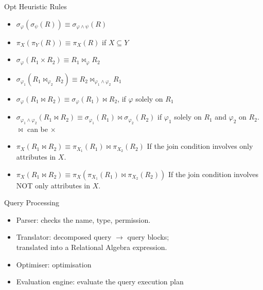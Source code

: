 \documentclass[a4paper]{article}
\begin{document}
\begin{multicols}{3}
\begin{cheatsheetblock} {Opt Heuristic Rules}
    \begin{itemize}
        \item $\sigma_{\varphi}\left(\sigma_\psi(R)\right) \equiv \sigma_{\varphi \wedge \psi}(R)$
        \item $\pi_X\left(\pi_Y(R)\right) \equiv \pi_X(R)$ if $X \subseteq Y$
        \item $\sigma_{\varphi}\left(R_1 \times R_2\right) \equiv R_1 \bowtie_{\varphi} R_2$
        \item $\sigma_{\varphi_1}\left(R_1 \bowtie_{\varphi_2} R_2\right) \equiv R_2 \bowtie_{\varphi_1 \wedge \varphi_2} R_1$
        \item $\sigma_{\varphi}\left(R_1 \bowtie R_2\right) \equiv \sigma_{\varphi}\left(R_1\right) \bowtie R_2$, if $\varphi$ solely on $R_1$
        \item $\sigma_{\varphi_1 \wedge \varphi_2}\left(R_1 \bowtie R_2\right) \equiv \sigma_{\varphi_1}\left(R_1\right) \bowtie \sigma_{\varphi_2}\left(R_2\right)$
              if $\varphi_1$ solely on $R_1$ and $\varphi_2$ on $R_2$. $\bowtie$ can be $\times$
        \item $\pi_X\left(R_1 \bowtie R_2\right) \equiv \pi_{X_1}\left(R_1\right) \bowtie \pi_{X_2}\left(R_2\right)$ If the join condition involves only attributes in $X$.
        \item $\pi_X\left(R_1 \bowtie R_2\right) \equiv \pi_X\left(\pi_{X_1}\left(R_1\right) \bowtie \pi_{X_2}\left(R_2\right)\right)$ If the join condition involves NOT only attributes in $X$.
    \end{itemize}
\end{cheatsheetblock}

\begin{cheatsheetblock} {Query Processing}
    \begin{itemize}
        \item Parser: checks the name, type, permission.
        \item Translator: decomposed query $\rightarrow$ query blocks; \\ translated into a Relational Algebra expression.
        \item Optimiser: optimisation
        \item Evaluation engine: evaluate the query execution plan
    \end{itemize}
\end{cheatsheetblock}


\end{multicols}
\end{document}
